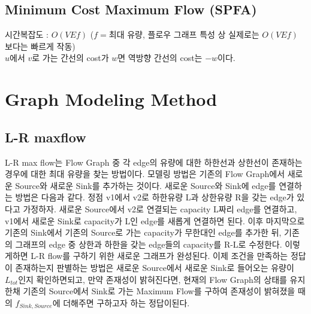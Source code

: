 \documentclass[10pt,landscape,a4paper,twocolumn]{article}
\begin{document}
\subsection{Minimum Cost Maximum Flow (SPFA)}
시간복잡도 : $O(VEf)$ \hspace{1em} ($f=$최대 유량, 플로우 그래프 특성 상 실제로는 $O(VEf)$ 보다는 빠르게 작동)\\
\hspace{1em}$u$에서 $v$로 가는 간선의 cost가 $w$면 역방향 간선의 cost는 $-w$이다.



%
%


\section{Graph Modeling Method}
\subsection{L-R maxflow}
\hspace{1em}L-R max flow는 Flow Graph 중 각 edge의 유량에 대한 하한선과 상한선이 존재하는 경우에 대한 최대 유량을 찾는 방법이다. 모델링 방법은 기존의 Flow Graph에서 새로운 Source와 새로운 Sink를 추가하는 것이다. 새로운 Source와 Sink에 edge를 연결하는 방법은 다음과 같다. 정점 v1에서 v2로 하한유량 L과 상한유량 R을 갖는 edge가 있다고 가정하자. 새로운 Source에서 v2로 연결되는 capacity L짜리 edge를 연결하고, v1에서 새로운 Sink로 capacity가 L인 edge를 새롭게 연결하면 된다. 이후 마지막으로 기존의 Sink에서 기존의 Source로 가는 capacity가 무한대인 edge를 추가한 뒤, 기존의 그래프의 edge 중 상한과 하한을 갖는 edge들의 capacity를 R-L로 수정한다. 이렇게하면 L-R flow를 구하기 위한 새로운 그래프가 완성된다. 이제 조건을 만족하는 정답이 존재하는지 판별하는 방법은 새로운 Source에서 새로운 Sink로 들어오는 유량이 $L_{tot}$인지 확인하면되고, 만약 존재성이 밝혀진다면, 현재의 Flow Graph의 상태를 유지한채 기존의 Source에서 Sink로 가는 Maximum Flow를 구하여 존재성이 밝혀졌을 때의 $f_{Sink,Source}$에 더해주면 구하고자 하는 정답이된다.
\end{document}
